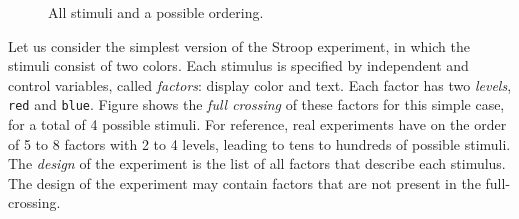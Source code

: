 \begin{figure}[t]%
    \centering
    \caption{All stimuli and a possible ordering.}%
    \label{fig:simple_full_crossing}%
\end{figure}

Let us consider the simplest version of the Stroop experiment, in which the stimuli consist of two colors. Each stimulus is specified by independent and control variables, called \emph{factors}: display color and text. Each factor has two \emph{levels}, \texttt{red} and \texttt{blue}. Figure  shows the \emph{full crossing} of these factors for this simple case, for a total of 4 possible stimuli. For reference, real experiments have on the order of 5 to 8 factors with 2 to 4 levels, leading to tens to hundreds of possible stimuli. The \emph{design} of the experiment is the list of all factors that describe each stimulus. The design of the experiment may contain factors that are not present in the full-crossing.


